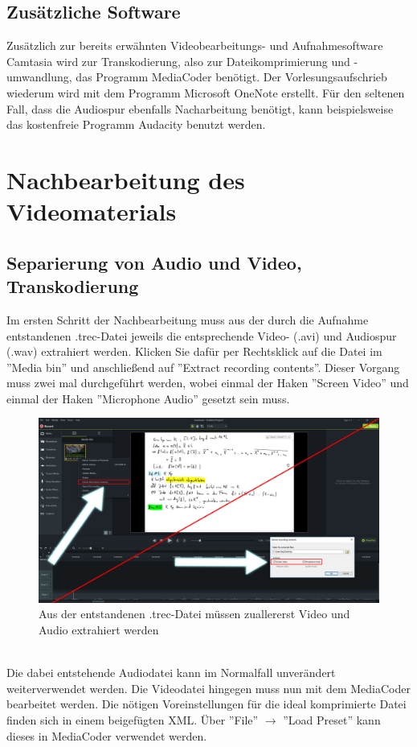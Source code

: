 \documentclass{scrreprt}
\begin{document}
\section{Zusätzliche Software}
Zusätzlich zur bereits erwähnten Videobearbeitungs- und Aufnahmesoftware Camtasia wird zur Transkodierung, also zur Dateikomprimierung und -umwandlung, das Programm MediaCoder benötigt. Der Vorlesungsaufschrieb wiederum wird mit dem Programm Microsoft OneNote erstellt. Für den seltenen Fall, dass die Audiospur ebenfalls Nacharbeitung benötigt, kann beispielsweise das kostenfreie Programm Audacity benutzt werden. 
\newpage 
\chapter{Nachbearbeitung des Videomaterials}
\section{Separierung von Audio und Video, Transkodierung}
Im ersten Schritt der Nachbearbeitung muss aus der durch die Aufnahme entstandenen .trec-Datei jeweils die entsprechende Video- (.avi) und Audiospur (.wav) extrahiert werden. Klicken Sie dafür per Rechtsklick auf die Datei im ''Media bin'' und anschließend auf ''Extract recording contents''. Dieser Vorgang muss zwei mal durchgeführt werden, wobei einmal der Haken ''Screen Video'' und einmal der Haken ''Microphone Audio'' gesetzt sein muss. 
\begin{figure}[h]
    \centering
    \includegraphics[width=1\textwidth]{extractrecordingcontents.png}
    \caption{Aus der entstandenen .trec-Datei müssen zuallererst Video und Audio extrahiert werden}
    \label{fig:extractrecordingcontents}
\end{figure}
\\ 
Die dabei entstehende Audiodatei kann im Normalfall unverändert weiterverwendet werden. Die Videodatei hingegen muss nun mit dem MediaCoder bearbeitet werden. Die nötigen Voreinstellungen für die ideal komprimierte Datei finden sich in einem beigefügten XML. Über ''File'' $\rightarrow$ ''Load Preset'' kann dieses in MediaCoder verwendet werden.
\end{document}
